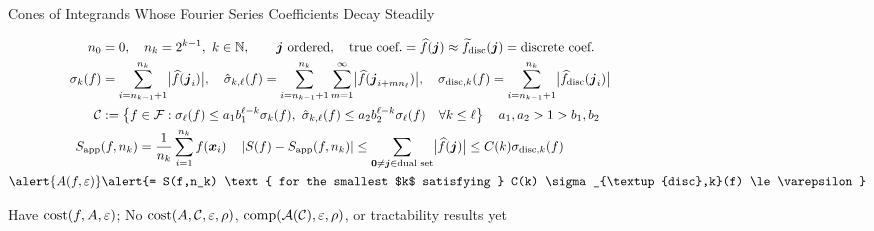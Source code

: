 \documentclass[11pt,compress,xcolor={usenames,dvipsnames},aspectratio=169]{beamer}
\newcommand{\Sapp}{S_{\textup{app}}}
\begin{document}
\begin{frame}{Cones of Integrands Whose Fourier Series Coefficients Decay Steadily}

\vspace{-8ex}

\begin{align*}
n_0 & = 0, \quad n_k = 2^{k-1}, \ k \in \naturals, \qquad \vj \text{ ordered}, \quad \text{true coef.} = \hf(\vj) \approx \tf_{\text{disc}}(\vj) = \text{discrete coef.}\\
	 \sigma_k(f) & = \sum_{i=n_{k-1}+1}^{n_k}  \bigabs{\hf(\vj_i)}, \quad  \hsigma_{k,\ell}(f)  = \sum_{i=n_{k-1}+1}^{n_k} \sum_{m=1}^{\infty} \bigabs{\hf(\vj_{i+mn_{\ell}})}, \quad \sigma_{\textup{disc},k}(f) = \sum_{i=n_{k-1}+1}^{n_k}  \bigabs{\hf_{\text{disc}}(\vj_i)} \\
	 \cc &: = \left\{f \in \cf :  
	 \sigma_\ell(f) \le a_1 b_1^{\ell - k}\sigma_k(f), \   \hsigma_{k,\ell}(f) \le a_2 b_2^{\ell - k} \sigma_\ell(f) \quad \forall k \le \ell \right\} \quad a_1, a_2 > 1 > b_1, b_2\\
      \MoveEqLeft{\Sapp(f,n_k) = \frac 1{n_k} \sum_{i=1}^{n_k} f(\vx_i)  \quad
    \abs{S(f) - \Sapp(f,n_k)} \le \sum_{\vzero \ne \vj \in \text{dual set}} \bigabs{\hf(\vj)} \le C(k) \sigma_{\textup{disc},k}(f)} \\
    \alert{A(f,\varepsilon)} & \alert{= S(f,n_k) \text{ for the smallest $k$ satisfying } C(k) \sigma_{\textup{disc},k}(f) \le \varepsilon}
\end{align*}

\vspace{-4ex}
\alert{Have} $\operatorname{cost}(f,A,\varepsilon)$; \quad \alert{No} $\operatorname{cost}(A,\mathcal{C},\varepsilon,\rho)$,  $\operatorname{comp}(\mathcal{A}(\mathcal{C}),\varepsilon,\rho)$, or  tractability results \alert{yet}

\end{frame}
\end{document}
